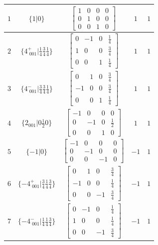 \documentclass[fleqn,8pt]{jsarticle}
\begin{document}
\begin{longtable}{ccccc}
$ 1 $ & $ \{1|0\} $ & $ \begin{bmatrix} 1 & 0 & 0 & 0 \\ 0 & 1 & 0 & 0 \\ 0 & 0 & 1 & 0 \end{bmatrix} $ & $ 1 $ & $ 1 $ \\ \hline
$ 2 $ & $ \{4^{+}_{\,\,001}|\frac{1}{4} \frac{3}{4} \frac{1}{4}\} $ & $ \begin{bmatrix} 0 & -1 & 0 & \frac{1}{4} \\ 1 & 0 & 0 & \frac{3}{4} \\ 0 & 0 & 1 & \frac{1}{4} \end{bmatrix} $ & $ 1 $ & $ 1 $ \\ \hline
$ 3 $ & $ \{4^{-}_{\,\,001}|\frac{3}{4} \frac{3}{4} \frac{1}{4}\} $ & $ \begin{bmatrix} 0 & 1 & 0 & \frac{3}{4} \\ -1 & 0 & 0 & \frac{3}{4} \\ 0 & 0 & 1 & \frac{1}{4} \end{bmatrix} $ & $ 1 $ & $ 1 $ \\ \hline
$ 4 $ & $ \{2{}_{001}|0 \frac{1}{2} 0\} $ & $ \begin{bmatrix} -1 & 0 & 0 & 0 \\ 0 & -1 & 0 & \frac{1}{2} \\ 0 & 0 & 1 & 0 \end{bmatrix} $ & $ 1 $ & $ 1 $ \\ \hline
$ 5 $ & $ \{-1|0\} $ & $ \begin{bmatrix} -1 & 0 & 0 & 0 \\ 0 & -1 & 0 & 0 \\ 0 & 0 & -1 & 0 \end{bmatrix} $ & $ -1 $ & $ 1 $ \\ \hline
$ 6 $ & $ \{-4^{+}_{\,\,001}|\frac{3}{4} \frac{1}{4} \frac{3}{4}\} $ & $ \begin{bmatrix} 0 & 1 & 0 & \frac{3}{4} \\ -1 & 0 & 0 & \frac{1}{4} \\ 0 & 0 & -1 & \frac{3}{4} \end{bmatrix} $ & $ -1 $ & $ 1 $ \\ \hline
$ 7 $ & $ \{-4^{-}_{\,\,001}|\frac{1}{4} \frac{1}{4} \frac{3}{4}\} $ & $ \begin{bmatrix} 0 & -1 & 0 & \frac{1}{4} \\ 1 & 0 & 0 & \frac{1}{4} \\ 0 & 0 & -1 & \frac{3}{4} \end{bmatrix} $ & $ -1 $ & $ 1 $ \\ \hline

\end{longtable}
\end{document}
